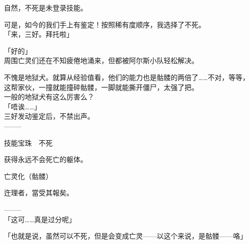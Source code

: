 自然，不死是未登录技能。

可是，如今的我们手上有鉴定！按照稀有度顺序，我选择了不死。\\

「来，三好。拜托啦」

「好的」\\

周围亡灵们还在不知疲倦地涌来，但都被阿尔斯小队轻松解决。

不愧是地狱犬。就算从经验值看，他们的能力也是骷髅的两倍了……不对，等等，这帮家伙，一撞就能撞碎骷髅，一脚就能撕开僵尸，太强了把。\\

一般的地狱犬有这么厉害么？\\

「唔诶……」\\

三好发动鉴定后，不禁出声。\\

  --------

  技能宝珠　不死

%  


  获得永远不会死亡的躯体。

  亡灵化（骷髅）

%  
 

  迕理者，當受其報矣。

  --------\\

「这可……真是过分呢」

「也就是说，虽然可以不死，但是会变成亡灵——以这个来说，是骷髅——咯」

